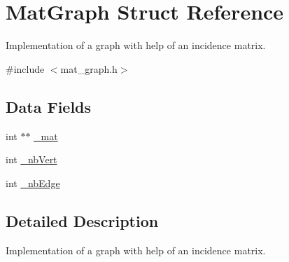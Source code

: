 \hypertarget{struct_mat_graph}{\section{Mat\-Graph Struct Reference}
\label{struct_mat_graph}
}


Implementation of a graph with help of an incidence matrix.  




{\ttfamily \#include $<$mat\-\_\-graph.\-h$>$}

\subsection*{Data Fields}
\begin{DoxyCompactItemize}
\item 
int $\ast$$\ast$ \hyperlink{struct_mat_graph_ae026787d2e6fdf8dfd382462fea13cd4}{\-\_\-mat}
\item 
int \hyperlink{struct_mat_graph_a3da3524d8a5c0b61107c4d25f8d23832}{\-\_\-nb\-Vert}
\item 
int \hyperlink{struct_mat_graph_a69fef280661aff966495a7c668e73284}{\-\_\-nb\-Edge}
\end{DoxyCompactItemize}


\subsection{Detailed Description}
Implementation of a graph with help of an incidence matrix. 

